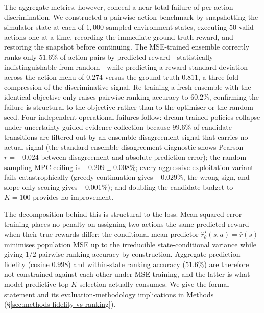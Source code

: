 \documentclass[11pt]{article}
\begin{document}
The aggregate metrics, however, conceal a near-total failure of per-action discrimination. We constructed a pairwise-action benchmark by snapshotting the simulator state at each of $1{,}000$ sampled environment states, executing $50$ valid actions one at a time, recording the immediate ground-truth reward, and restoring the snapshot before continuing. The MSE-trained ensemble correctly ranks only $51.6\%$ of action pairs by predicted reward---statistically indistinguishable from random---while predicting a reward standard deviation across the action menu of $0.274$ versus the ground-truth $0.811$, a three-fold compression of the discriminative signal. Re-training a fresh ensemble with the identical objective only raises pairwise ranking accuracy to $60.2\%$, confirming the failure is structural to the objective rather than to the optimiser or the random seed. Four independent operational failures follow: dream-trained policies collapse under uncertainty-guided evidence collection because $99.6\%$ of candidate transitions are filtered out by an ensemble-disagreement signal that carries no actual signal (the standard ensemble disagreement diagnostic shows Pearson $r = -0.024$ between disagreement and absolute prediction error); the random-sampling MPC ceiling is $-0.209 \pm 0.008\%$; every aggressive-exploitation variant fails catastrophically (greedy continuation gives $+0.029\%$, the wrong sign, and slope-only scoring gives $-0.001\%$); and doubling the candidate budget to $K{=}100$ provides no improvement.

The decomposition behind this is structural to the loss. Mean-squared-error training places no penalty on assigning two actions the same predicted reward when their true rewards differ; the conditional-mean predictor $\hat{r}_\theta^{\star}(s,a) = \bar{r}(s)$ minimises population MSE up to the irreducible state-conditional variance while giving $1/2$ pairwise ranking accuracy by construction. Aggregate prediction fidelity (cosine $0.998$) and within-state ranking accuracy ($51.6\%$) are therefore not constrained against each other under MSE training, and the latter is what model-predictive top-$K$ selection actually consumes. We give the formal statement and its evaluation-methodology implications in Methods (\S\ref{sec:methods-fidelity-vs-ranking}).
\end{document}
